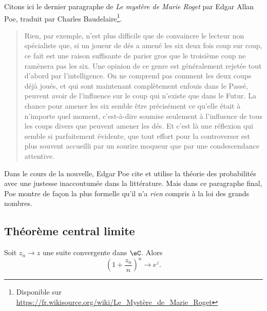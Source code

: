 \begin{example}
	Citons ici le dernier paragraphe de \emph{Le mystère de Marie Roget} par Edgar Allan Poe, traduit par Charles Baudelaire\footnote{Disponible sur \url{https://fr.wikisource.org/wiki/Le_Mystère_de_Marie_Roget}}.

	\begin{quote}
		Rien, par exemple, n’est plus difficile que de convaincre le lecteur non spécialiste que, si un joueur de dés a amené les six deux fois coup sur coup, ce fait est une raison suffisante de parier gros que le troisième coup ne ramènera pas les six. Une opinion de ce genre est généralement rejetée tout d’abord par l’intelligence. On ne comprend pas comment les deux coups déjà joués, et qui sont maintenant complètement enfouis dans le Passé, peuvent avoir de l’influence sur le coup qui n’existe que dans le Futur. La chance pour amener les six semble être précisément ce qu’elle était à n’importe quel moment, c’est-à-dire soumise seulement à l’influence de tous les coups divers que peuvent amener les dés. Et c’est là une réflexion qui semble si parfaitement évidente, que tout effort pour la controverser est plus souvent accueilli par un sourire moqueur que par une condescendance attentive.
	\end{quote}
	Dans le cours de la nouvelle, Edgar Poe cite et utilise la théorie des probabilités avec une justesse inaccoutumée dans la littérature. Mais dans ce paragraphe final, Poe montre de façon la plus formelle qu'il n'a \emph{rien} compris à la loi des grands nombres.
\end{example}

\subsection{Théorème central limite}

\begin{lemma}       \label{Lemexpznznsurnton}
	Soit \( z_n\to z\) une suite convergente dans \( \eC\). Alors
	\begin{equation}
		\left( 1+\frac{ z_n }{ n } \right)^n\to e^z.
	\end{equation}
\end{lemma}

